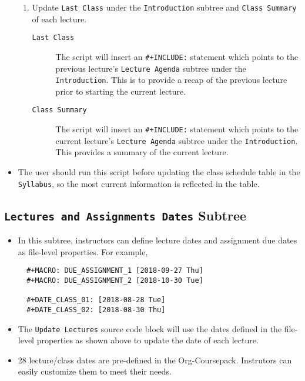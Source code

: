 \documentclass[10pt,article]{article}
\begin{document}
\begin{itemize}
\begin{enumerate}
\item Update \texttt{Last Class} under the \texttt{Introduction} subtree and \texttt{Class Summary} of
each lecture. 

\begin{description}
\item[{\texttt{Last Class}}] The script will insert an \texttt{\#+INCLUDE:}
statement which points to the previous
lecture's \texttt{Lecture Agenda} subtree under the
\texttt{Introduction}. This is to provide a recap of
the previous lecture prior to starting the
current lecture.

\item[{\texttt{Class Summary}}] The script will insert an \texttt{\#+INCLUDE:}
statement which points to the current lecture's \texttt{Lecture
          Agenda} subtree under the \texttt{Introduction}. This provides a
summary of the current lecture.
\end{description}
\end{enumerate}

\item The user should run this script before updating the class schedule table 
in the \texttt{Syllabus}, so the most current information is reflected in the table.
\end{itemize}
\subsection{\texttt{Lectures and Assignments Dates} Subtree}
\label{sec:org54ba724}
\begin{itemize}
\item In this subtree, instructors can define lecture dates and assignment
due dates as file-level properties. For example,

\begin{verbatim}
  #+MACRO: DUE_ASSIGNMENT_1 [2018-09-27 Thu]
  #+MACRO: DUE_ASSIGNMENT_2 [2018-10-30 Tue]
  
  #+DATE_CLASS_01: [2018-08-28 Tue]
  #+DATE_CLASS_02: [2018-08-30 Thu]
\end{verbatim}

\item The \texttt{Update Lectures} source code block will use the dates defined
in the file-level properties as shown above to update the date of each lecture.

\item 28 lecture/class dates are pre-defined in the
Org-Coursepack. Instrutors can easily customize them to meet their needs.
\end{itemize}
\end{document}
